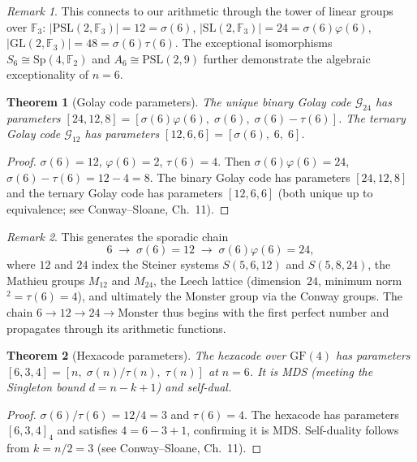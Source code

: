 \documentclass[11pt]{amsart}
\newtheorem{theorem}{Theorem}
\theoremstyle{remark}
\newtheorem*{remark}{Remark}
\begin{document}
\begin{remark}
This connects to our arithmetic through the tower of linear groups
over $\mathbb{F}_3$:
$|\mathrm{PSL}(2,\mathbb{F}_3)| = 12 = \sigma(6)$,
$|\mathrm{SL}(2,\mathbb{F}_3)| = 24 = \sigma(6)\varphi(6)$,
$|\mathrm{GL}(2,\mathbb{F}_3)| = 48 = \sigma(6)\tau(6)$.
The exceptional isomorphisms $S_6 \cong \mathrm{Sp}(4,\mathbb{F}_2)$
and $A_6 \cong \mathrm{PSL}(2,9)$ further demonstrate
the algebraic exceptionality of $n = 6$.
\end{remark}

\begin{theorem}[Golay code parameters]\label{thm:golay}
The unique binary Golay code $\mathcal{G}_{24}$ has parameters
$[24, 12, 8] = [\sigma(6)\varphi(6),\; \sigma(6),\; \sigma(6) - \tau(6)]$.
The ternary Golay code $\mathcal{G}_{12}$ has parameters
$[12, 6, 6] = [\sigma(6),\; 6,\; 6]$.
\end{theorem}

\begin{proof}
$\sigma(6) = 12$, $\varphi(6) = 2$, $\tau(6) = 4$.
Then $\sigma(6)\varphi(6) = 24$, $\sigma(6) - \tau(6) = 12 - 4 = 8$.
The binary Golay code has parameters $[24, 12, 8]$ and the ternary
Golay code has parameters $[12, 6, 6]$ (both unique up to equivalence;
see Conway--Sloane, Ch.~11).
\end{proof}

\begin{remark}
This generates the sporadic chain
\[
  6 \;\longrightarrow\; \sigma(6) = 12 \;\longrightarrow\; \sigma(6)\varphi(6) = 24,
\]
where $12$ and $24$ index the Steiner systems $S(5,6,12)$ and $S(5,8,24)$,
the Mathieu groups $M_{12}$ and $M_{24}$, the Leech lattice
(dimension~$24$, minimum norm${}^2 = \tau(6) = 4$),
and ultimately the Monster group via the Conway groups.
The chain $6 \to 12 \to 24 \to \mathrm{Monster}$ thus begins with the
first perfect number and propagates through its arithmetic functions.
\end{remark}

\begin{theorem}[Hexacode parameters]\label{thm:hexacode}
The hexacode over $\mathrm{GF}(4)$ has parameters
$[6, 3, 4] = [n,\; \sigma(n)/\tau(n),\; \tau(n)]$ at $n = 6$.
It is MDS (meeting the Singleton bound $d = n - k + 1$) and self-dual.
\end{theorem}

\begin{proof}
$\sigma(6)/\tau(6) = 12/4 = 3$ and $\tau(6) = 4$.
The hexacode has parameters $[6, 3, 4]_4$ and satisfies
$4 = 6 - 3 + 1$, confirming it is MDS.
Self-duality follows from $k = n/2 = 3$
(see Conway--Sloane, Ch.~11).
\end{proof}
\end{document}
